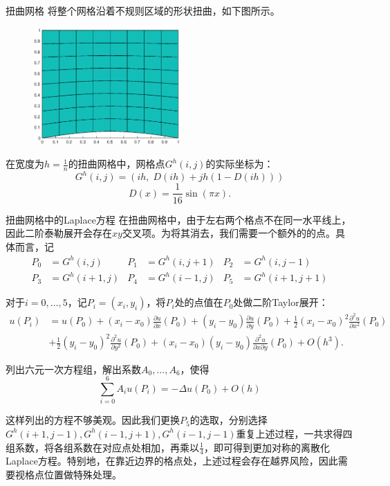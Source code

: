 \documentclass[9pt]{beamer}
\begin{document}
\begin{frame}{扭曲网格}
将整个网格沿着不规则区域的形状扭曲，如下图所示。

\begin{figure}[H]
  \centering
  \includegraphics[width=0.5\textwidth]{../report/figure/3-1.eps}
\end{figure}

在宽度为$h=\frac{1}{n}$的扭曲网格中，网格点$G^h(i,j)$的实际坐标为：
\begin{equation}
  G^h(i,j)=(ih,\;D(ih)+jh(1-D(ih)))
\end{equation}
\begin{equation*}
D(x)=\frac{1}{16}\sin(\pi x).
\end{equation*}
\end{frame}

\begin{frame}{扭曲网格中的Laplace方程}
\small
在扭曲网格中，由于左右两个格点不在同一水平线上，因此二阶泰勒展开会存在$xy$交叉项。为将其消去，我们需要一个额外的的点。具体而言，记
\begin{align*}
  P_0&=G^h(i,j) & P_1&=G^h(i,j+1) & P_2&=G^h(i,j-1)\\
  P_3&=G^h(i+1,j) & P_4&=G^h(i-1,j) & P_5&=G^h(i+1,j+1)
\end{align*}

\pause
对于$i=0,...,5$，记$P_i=(x_i,y_i)$，将$P_i$处的点值在$P_0$处做二阶Taylor展开：
\begin{align*}
  u(P_i)&=u(P_0)+(x_i-x_0)\frac{\partial u}{\partial x}(P_0)+(y_i-y_0)\frac{\partial u}{\partial y}(P_0)
  +\frac{1}{2}(x_i-x_0)^2\frac{\partial^2 u}{\partial x^2}(P_0) \\
  & +\frac{1}{2}(y_i-y_0)^2\frac{\partial^2 u}{\partial y^2}(P_0)
  +(x_i-x_0)(y_i-y_0)\frac{\partial^2 u}{\partial x \partial y}(P_0)+O(h^3).
\end{align*}

\pause
列出六元一次方程组，解出系数$A_0,...,A_6$，使得
\begin{equation*}
  \sum_{i=0}^6 A_iu(P_i)=-\Delta u(P_0)+O(h)
\end{equation*}

\pause
这样列出的方程不够美观。因此我们更换$P_5$的选取，分别选择$G^h(i+1,j-1),G^h(i-1,j+1),G^h(i-1,j-1)$重复上述过程，一共求得四组系数，将各组系数在对应点处相加，再乘以$\frac{1}{4}$，即可得到更加对称的离散化Laplace方程。特别地，在靠近边界的格点处，上述过程会存在越界风险，因此需要视格点位置做特殊处理。
\end{frame}
\end{document}
